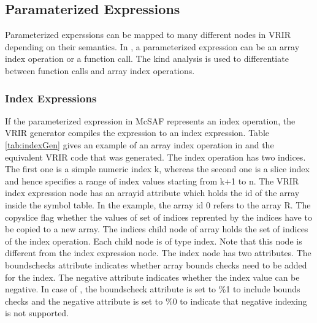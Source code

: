 \subsection{Paramaterized Expressions}
\label{subsec:paramGen}
Parameterized experssions can be mapped to many different nodes in VRIR depending on their semantics. In \matlab, a parameterized expression can be an array index operation or a function call. The kind analysis\cite{Doherty:2011:KAM:2076021.2048077} is  used to differentiate between function calls and array index operations. 
\subsubsection{Index Expressions}
If the parameterized expression in McSAF represents an index operation, the VRIR generator compiles the expression to an index expression. Table \ref{tab:indexGen} gives an example of an array index operation in \matlab and the equivalent VRIR code that was generated. The index operation has two indices. The first one is a simple numeric index \textsf{k},  whereas the second one is a slice index and hence specifies a range of index values starting from \textsf{k+1} to \textsf{n}. The VRIR index expression node  has an \textsf{arrayid} attribute which holds the id of the array inside the symbol table. In the example, the array id 0 refers to the array R. The copyslice flag whether the values of set of indices reprented by the indices have to be copied to a new array. The \textsf{indices} child node of array holds the set of indices of the index operation. Each child node is of type index. Note that this node is different from the index expression node. The index node has two attributes. The \textsf{boundschecks} attribute indicates whether array bounds checks need to be added for the index. The \textsf{negative} attribute indicates whether the index value can be negative. In case of \matlab, the \textsf{boundscheck} attribute  is set to \textsf{\%1} to include bounds checks and the \textsf{negative} attribute is set to \textsf{\%0} to indicate that negative indexing is not supported. 
